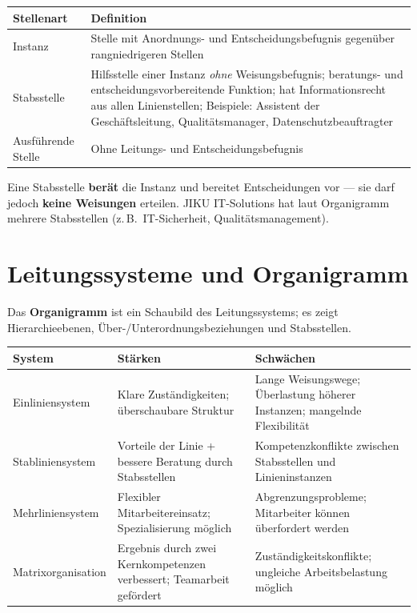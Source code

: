 \documentclass[11pt, a4paper]{article}
\begin{document}
\begin{center}
\begin{tabular}{p{3.5cm} p{9.5cm}}
\toprule
\textbf{Stellenart} & \textbf{Definition}\\
\midrule
Instanz & Stelle mit Anordnungs- und Entscheidungsbefugnis gegenüber rangniedrigeren Stellen\\
\addlinespace
Stabsstelle & Hilfsstelle einer Instanz \emph{ohne} Weisungsbefugnis; beratungs- und
entscheidungsvorbereitende Funktion; hat Informationsrecht aus allen Linienstellen;
Beispiele: Assistent der Geschäftsleitung, Qualitätsmanager, Datenschutzbeauftragter\\
\addlinespace
Ausführende Stelle & Ohne Leitungs- und Entscheidungsbefugnis\\
\bottomrule
\end{tabular}
\end{center}

\begin{merksatz}[title={\bfseries Merke: Stabsstelle}]
Eine Stabsstelle \textbf{berät} die Instanz und bereitet Entscheidungen vor --- sie darf jedoch
\textbf{keine Weisungen} erteilen. JIKU IT-Solutions hat laut Organigramm mehrere Stabsstellen
(z.\,B.\ IT-Sicherheit, Qualitätsmanagement).
\end{merksatz}

\section{Leitungssysteme und Organigramm}

Das \textbf{Organigramm} ist ein Schaubild des Leitungssystems; es zeigt Hierarchieebenen,
Über-/Unterordnungsbeziehungen und Stabsstellen.

\begin{center}
\begin{tabular}{p{3.5cm} p{4.5cm} p{4.5cm}}
\toprule
\textbf{System} & \textbf{Stärken} & \textbf{Schwächen}\\
\midrule
Einliniensystem & Klare Zuständigkeiten; überschaubare Struktur & Lange Weisungswege; Überlastung höherer Instanzen; mangelnde Flexibilität\\
\addlinespace
Stabliniensystem & Vorteile der Linie + bessere Beratung durch Stabsstellen & Kompetenzkonflikte zwischen Stabsstellen und Linieninstanzen\\
\addlinespace
Mehrliniensystem & Flexibler Mitarbeitereinsatz; Spezialisierung möglich & Abgrenzungsprobleme; Mitarbeiter können überfordert werden\\
\addlinespace
Matrixorganisation & Ergebnis durch zwei Kernkompetenzen verbessert; Teamarbeit gefördert & Zuständigkeitskonflikte; ungleiche Arbeitsbelastung möglich\\
\bottomrule
\end{tabular}
\end{center}
\end{document}

